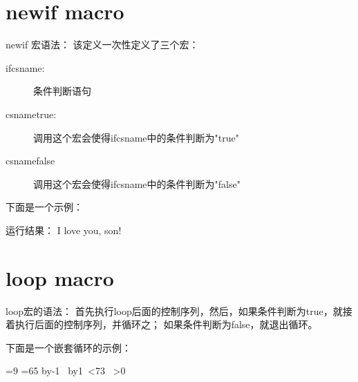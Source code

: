 ﻿\documentclass{article}
\begin{document}
  \tt %

  \pagestyle{header}
  \sybmaketitle
  \tableofcontents
  \newpage

  \pagestyle{main}
  \setcounter{page}{1}

  \section[newif macro]{\bs newif macro}
  \bs newif 宏语法：
  该定义一次性定义了三个宏：
  \begin{description}
    \item[\bs if\lt csname\gt:] 条件判断语句
    \item[\bs\lt csname\gt true:] 调用这个宏会使得\bs if\lt csname\gt 中的条件判断为"true"
    \item[\bs\lt csname\gt false] 调用这个宏会使得\bs if\lt csname\gt 中的条件判断为"false"
  \end{description}
  下面是一个示例：

  \begin{latexcode}
\newif\ifboy
\newif\ifgirl
\ifboytrue
\ifboy{I love you, son!}\fi
\ifgirl{I love you, daughter!}\fi
  \end{latexcode}

  运行结果：
  \newif\ifboy
  \newif\ifgirl
  \boytrue
  \ifboy{I love you, son!}\fi
  \ifgirl{I love you, daughter!}\fi

  \section[loop macro]{loop macro}
  \bs loop宏的语法：
  首先执行\bs loop后面的控制序列，然后，如果条件判断为true，就接着执行后面的控制序列，并循环之；
  如果条件判断为false，就退出循环。

  下面是一个嵌套循环的示例：

  \begin{latexcode}
\vbox{
  =9
  \loop
    =65 %
    \advance{} by-1
    \hbox{%
      \loop
      \char{} \the{}
      \advance{} by1
      \ifnum{}<73
      \space
      \repeat
    }
  \ifnum{}>0
  \repeat
}
  \end{latexcode}
\end{document}
